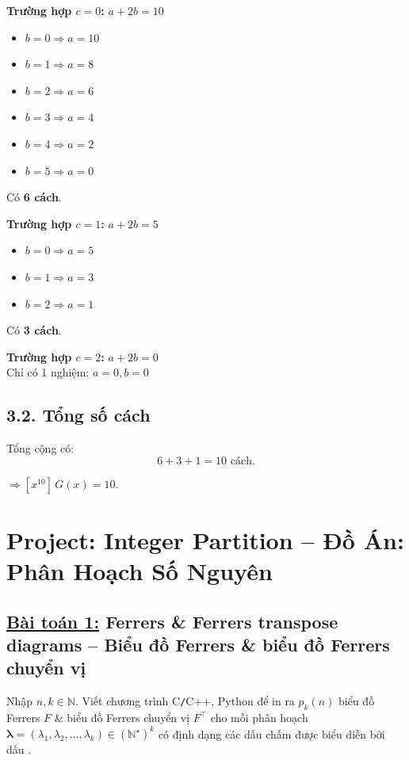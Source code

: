 \documentclass{article}
\begin{document}
	\noindent\textbf{Trường hợp \(c = 0\):} \(a + 2b = 10\)
	
	\begin{itemize}[leftmargin=1.5cm]
		\item \(b = 0 \Rightarrow a = 10\)
		\item \(b = 1 \Rightarrow a = 8\)
		\item \(b = 2 \Rightarrow a = 6\)
		\item \(b = 3 \Rightarrow a = 4\)
		\item \(b = 4 \Rightarrow a = 2\)
		\item \(b = 5 \Rightarrow a = 0\)
	\end{itemize}
	Có \textbf{6 cách}.
	
	\noindent\textbf{Trường hợp \(c = 1\):} \(a + 2b = 5\)
	
	\begin{itemize}[leftmargin=1.5cm]
		\item \(b = 0 \Rightarrow a = 5\)
		\item \(b = 1 \Rightarrow a = 3\)
		\item \(b = 2 \Rightarrow a = 1\)
	\end{itemize}
	Có \textbf{3 cách}.
	
	\noindent\textbf{Trường hợp \(c = 2\):} \(a + 2b = 0\) \\
	Chỉ có 1 nghiệm: \(a = 0, b = 0\)
	
	\subsection*{3.2. Tổng số cách}
	
	Tổng cộng có:
	\[
	6 + 3 + 1 = \boxed{10} \text{ cách}.
	\]
	
	$\Rightarrow [x^{10}]\,G(x) = 10.$
	
	\section*{Project: Integer Partition -- Đồ Án: Phân Hoạch Số Nguyên}
	
	\subsection*{\underline{Bài toán 1:} Ferrers \& Ferrers transpose diagrams -- Biểu đồ Ferrers \& biểu đồ Ferrers chuyển vị}
	
	Nhập $n,k\in\mathbb{N}$. Viết chương trình {\sf C{\tt/}C++, Python} để in ra $p_k(n)$ biểu đồ Ferrers $F$ \& biểu đồ Ferrers chuyển vị $F^\top$ cho mỗi phân hoạch $\boldsymbol{\lambda} = (\lambda_1,\lambda_2,\ldots,\lambda_k)\in(\mathbb{N}^\star)^k$ có định dạng các dấu chấm được biểu diễn bởi dấu {\tt*}.
	
\end{document}
